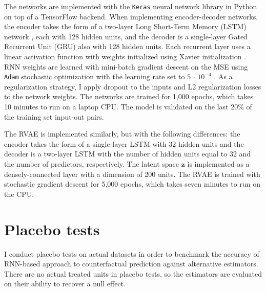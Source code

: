 \documentclass[hidelinks,12pt]{article}
\begin{document}
The networks are implemented with the \texttt{Keras} neural network library \citep{chollet2015keras} in Python on top of a TensorFlow backend. When implementing encoder-decoder networks, the encoder takes the form of a two-layer Long Short-Term Memory (LSTM) network \citep{schmidhuber1997long}, each with 128 hidden units, and the decoder is a single-layer Gated Recurrent Unit (GRU) \citep{chung2014} also with 128 hidden units. Each recurrent layer uses a linear activation function with weights initialized using Xavier initialization \citep{glorot2010}. RNN weights are learned with mini-batch gradient descent on the MSE using \texttt{Adam} stochastic optimization with the learning rate set to $5\,\cdot\,10^{-4}$ \citep{kingma2014adam}. As a regularization strategy, I apply dropout to the inputs and L2 regularization losses to the network weights. The networks are trained for 1,000 epochs, which takes 10 minutes to run on a laptop CPU. The model is validated on the last 20\% of the training set input-out pairs.  

The RVAE is implemented similarly, but with the following differences: the encoder takes the form of a single-layer LSTM with 32 hidden units and the decoder is a two-layer LSTM with the number of hidden units equal to 32 and the number of predictors, respectively. The latent space $\boldsymbol{z}$ is implemented as a densely-connected layer with a dimension of 200 units. The RVAE is trained with stochastic gradient descent for 5,000 epochs, which takes seven minutes to run on the CPU. 

\section{Placebo tests} \label{placebo}

I conduct placebo tests on actual datasets in order to benchmark the accuracy of RNN-based approach to counterfactual prediction against alternative estimators. There are no actual treated units in placebo tests, so the estimators are evaluated on their ability to recover a null effect. 
\end{document}
